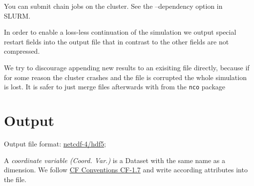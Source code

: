 \begin{tcolorbox}[title=Note]
    You can submit chain jobs on the cluster. See the --dependency option in SLURM.
\end{tcolorbox}
\begin{tcolorbox}[title=Note]
In order to enable a
loss-less continuation of the simulation we output special restart fields into
the output file that in contrast to the other fields are not compressed.
\end{tcolorbox}


\begin{tcolorbox}[title=Note]
We try to discourage
appending new results to an exisiting file directly, because if for some reason
the cluster crashes and the file is corrupted the whole simulation is lost.
It is safer to just merge files afterwards with
from the \texttt{nco} package
\end{tcolorbox}

\section{Output} \label{sec:output_file}
Output file format: \href{https://www.unidata.ucar.edu/software/netcdf/docs/}{netcdf-4/hdf5};

A \textit{coordinate variable (Coord. Var.)} is a Dataset with the same name as a dimension.
We follow
\href{http://cfconventions.org/Data/cf-conventions/cf-conventions-1.7/cf-conventions.html}{CF Conventions CF-1.7}
and write according attributes into the file.

